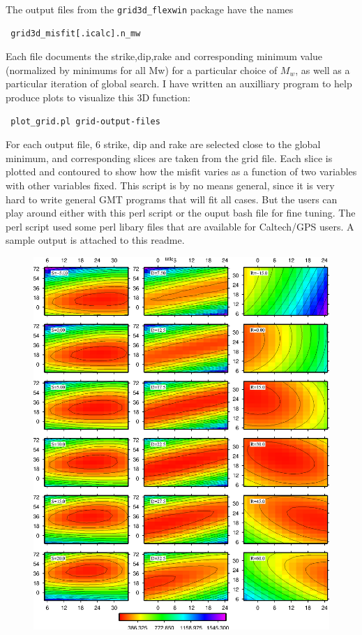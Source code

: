 \documentclass[12pt,titlepage,fleqn]{article}
\begin{document}
The output files from the \verb-grid3d_flexwin- package have the names 
\begin{verbatim}
 grid3d_misfit[.icalc].n_mw
\end{verbatim}
Each file documents the strike,dip,rake and corresponding minimum value (normalized by minimums for all Mw) for a particular choice of $M_w$, as well as a particular iteration of global search. I have written an auxilliary program to help produce plots to visualize this 3D function:
\begin{verbatim}
 plot_grid.pl grid-output-files
\end{verbatim}
For each output file, 6 strike, dip and rake are selected close to the global minimum, and corresponding slices are taken from the grid file. Each slice is plotted and contoured to show how the misfit varies as a function of two variables with other variables fixed. This script is by no means general, since it is very hard to write general GMT programs that will fit all cases. But the users can play around either with this perl script or the ouput bash file for fine tuning. The perl script used some perl libary files that are available for Caltech/GPS users. A sample output is attached to this readme.

\begin{figure}
\begin{center}
     \includegraphics[width=6in]{grid_0.eps}%
  \end{center}
\end{figure}

\end{document}
